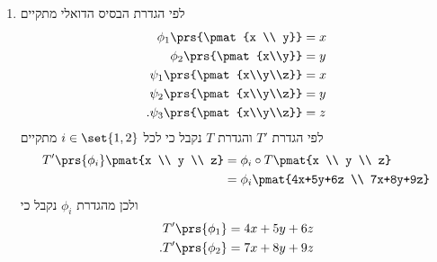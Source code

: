 \documentclass[a4paper,10pt,twoside,openany]{book}
\begin{document}
\begin{solution}
\begin{enumerate}
\item
לפי הגדרת הבסיס הדואלי מתקיים
\begin{align*}
\phi_1\prs{\pmat{x \\ y}} &= x \\
\phi_2\prs{\pmat{x\\y}} &= y \\
\psi_1\prs{\pmat{x\\y\\z}} &= x \\
\psi_2\prs{\pmat{x\\y\\z}} &= y \\
\text{.} \psi_3\prs{\pmat{x\\y\\z}} &= z
\end{align*}
לפי הגדרת
$T'$
והגדרת
$T$
נקבל כי לכל
$i \in \set{1,2}$
מתקיים
\begin{align*}
T'\prs{\phi_i} \pmat{x \\ y \\ z} &= \phi_i \circ T \pmat{x \\ y \\ z}
\\&= \phi_i \pmat{4x+5y+6z \\ 7x+8y+9z}
\end{align*}
ולכן מהגדרת
$\phi_i$
נקבל כי
\begin{align*}
T'\prs{\phi_1} &= 4x+5y+6z \\
\text{.} T'\prs{\phi_2} &= 7x+8y+9z
\end{align*}


\end{enumerate}
\end{solution}
\end{document}
